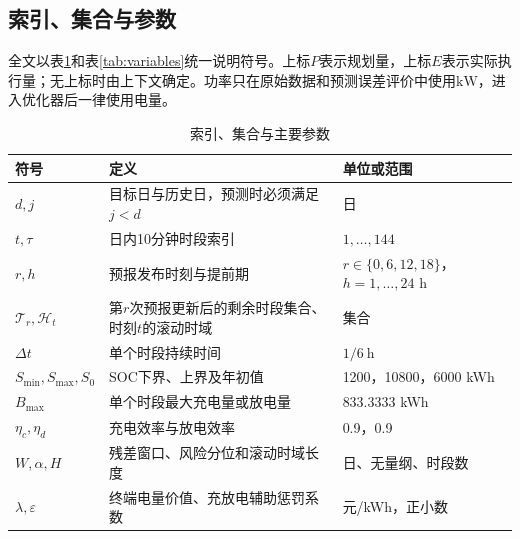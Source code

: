 \documentclass[UTF8,12pt,a4paper]{ctexart}
\theoremstyle{remark}
\begin{document}
\subsection{索引、集合与参数}
全文以表\ref{tab:index-parameters}和表\ref{tab:variables}统一说明符号。上标$P$表示规划量，上标$E$表示实际执行量；无上标时由上下文确定。功率只在原始数据和预测误差评价中使用$\mathrm{kW}$，进入优化器后一律使用电量。
\begin{table}[H]\centering\small\caption{索引、集合与主要参数}\label{tab:index-parameters}
\begin{tabular}{p{}p{}p{}}\toprule 符号&定义&单位或范围\\\midrule
$d,j$&目标日与历史日，预测时必须满足$j<d$&日\\
$t,\tau$&日内10分钟时段索引&$1,\ldots,144$\\
$r,h$&预报发布时刻与提前期&$r\in\{0,6,12,18\}$，$h=1,\ldots,24$ h\\
$\mathcal T_r,\mathcal H_t$&第$r$次预报更新后的剩余时段集合、时刻$t$的滚动时域&集合\\
$\Delta t$&单个时段持续时间&$1/6\ \mathrm h$\\
$S_{\min},S_{\max},S_0$&SOC下界、上界及年初值&1200，10800，6000 kWh\\
$B_{\max}$&单个时段最大充电量或放电量&833.3333 kWh\\
$\eta_c,\eta_d$&充电效率与放电效率&0.9，0.9\\
$W,\alpha,H$&残差窗口、风险分位和滚动时域长度&日、无量纲、时段数\\
$\lambda,\varepsilon$&终端电量价值、充放电辅助惩罚系数&元/kWh，正小数\\\bottomrule
\end{tabular}\end{table}
\end{document}
